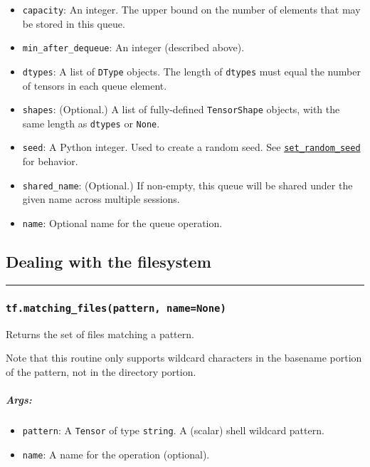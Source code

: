\begin{itemize}
\tightlist
\item
  \texttt{capacity}: An integer. The upper bound on the number of
  elements that may be stored in this queue.
\item
  \texttt{min\_after\_dequeue}: An integer (described above).
\item
  \texttt{dtypes}: A list of \texttt{DType} objects. The length of
  \texttt{dtypes} must equal the number of tensors in each queue
  element.
\item
  \texttt{shapes}: (Optional.) A list of fully-defined
  \texttt{TensorShape} objects, with the same length as \texttt{dtypes}
  or \texttt{None}.
\item
  \texttt{seed}: A Python integer. Used to create a random seed. See
  \href{../../api_docs/python/constant_op.md\#set_random_seed}{\texttt{set\_random\_seed}}
  for behavior.
\item
  \texttt{shared\_name}: (Optional.) If non-empty, this queue will be
  shared under the given name across multiple sessions.
\item
  \texttt{name}: Optional name for the queue operation.
\end{itemize}

\subsection{Dealing with the filesystem
}\label{dealing-with-the-filesystem}

\begin{center}\rule{0.5\linewidth}{\linethickness}\end{center}

\subsubsection{\texorpdfstring{\texttt{tf.matching\_files(pattern,\ name=None)}
}{tf.matching\_files(pattern, name=None) }}\label{tf.matchingux5ffilespattern-namenone}

Returns the set of files matching a pattern.

Note that this routine only supports wildcard characters in the basename
portion of the pattern, not in the directory portion.

\subparagraph{Args: }\label{args-56}

\begin{itemize}
\tightlist
\item
  \texttt{pattern}: A \texttt{Tensor} of type \texttt{string}. A
  (scalar) shell wildcard pattern.
\item
  \texttt{name}: A name for the operation (optional).
\end{itemize}

